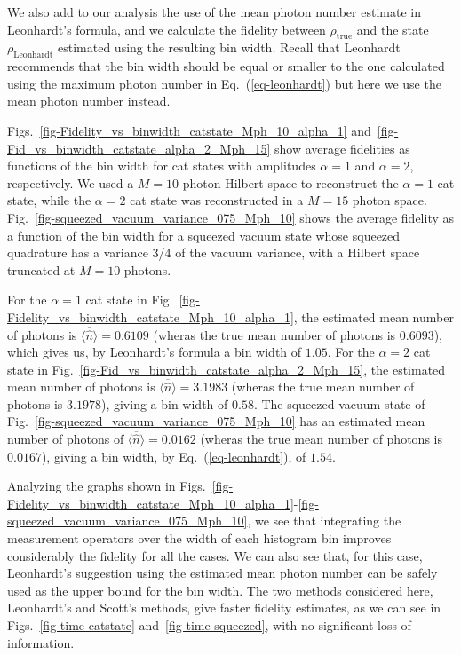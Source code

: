 \documentclass[
reprint,
superscriptaddress,
showpacs,
amsmath,
amssymb,
aps,
pra,
longbibliography
]{revtex4-1}
\newcommand{\rhotrue}{\rho_{\text{true}}}
\begin{document}
We also add to our analysis the use of the mean photon number
estimate in Leonhardt's formula, and we calculate the fidelity
between $\rhotrue$ and the state $\rho_{\mathrm{Leonhardt}}$
estimated using the resulting bin width. Recall that Leonhardt recommends
that the bin width should be equal or smaller to the one
calculated using the maximum photon number in Eq.~(\ref{eq-leonhardt}) 
but here we use the mean photon number instead.

Figs.~\ref{fig-Fidelity_vs_binwidth_catstate_Mph_10_alpha_1}
and~\ref{fig-Fid_vs_binwidth_catstate_alpha_2_Mph_15} show average 
fidelities as functions of the bin width for cat states with 
amplitudes $\alpha=1$ and $\alpha=2$, respectively. We used a 
$M=10$ photon Hilbert space to reconstruct the $\alpha = 1$ cat state, 
while the $\alpha = 2$ cat state was reconstructed in a $M=15$ photon space. 
Fig.~\ref{fig-squeezed_vacuum_variance_075_Mph_10} shows the
average fidelity as a function of the bin width for a squeezed
vacuum state whose squeezed quadrature has a variance 3/4 of the
vacuum variance, with a Hilbert space truncated at $M=10$ photons.

For the $\alpha = 1$ cat state in
Fig.~\ref{fig-Fidelity_vs_binwidth_catstate_Mph_10_alpha_1}, the
estimated mean number of photons is $\overline{\langle \hat{n} \rangle}=0.6109$ (wheras the true mean number of photons is $0.6093$), which gives us, by Leonhardt's formula a bin width of $1.05$. For the $\alpha = 2$ cat state
in Fig.~\ref{fig-Fid_vs_binwidth_catstate_alpha_2_Mph_15}, the
estimated mean number of photons is $\overline{\langle \hat{n} \rangle}=3.1983$ (wheras the true mean number of photons is $3.1978$), giving a bin
width of $0.58$. The squeezed vacuum state of Fig.~\ref{fig-squeezed_vacuum_variance_075_Mph_10} has an estimated mean number of photons of $\overline{\langle \hat{n} \rangle}=0.0162$ (wheras the true
mean number of photons is $0.0167$), giving a bin width, by Eq.~(\ref{eq-leonhardt}), of $1.54$.

Analyzing the graphs shown in
Figs.~\ref{fig-Fidelity_vs_binwidth_catstate_Mph_10_alpha_1}-\ref{fig-squeezed_vacuum_variance_075_Mph_10},
we see that integrating the measurement operators over the width of
each histogram bin improves considerably the fidelity for all the
cases. We can also see that, for this case, Leonhardt's suggestion
using the estimated mean photon number can be safely
used as the upper bound for the bin width. The
two methods considered here, Leonhardt's and Scott's methods, give
faster fidelity estimates, as we can see in Figs.~\ref{fig-time-catstate}
and~\ref{fig-time-squeezed}, with no significant loss of
information.
   
\end{document}
